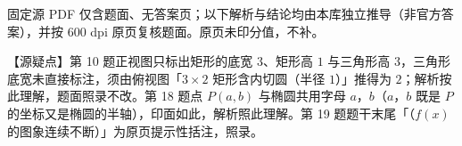 
\begin{gktip}
固定源 PDF 仅含题面、无答案页；以下解析与结论均由本库独立推导（非官方答案），并按 600 dpi 原页复核题面。原页未印分值，不补。

【源疑点】第 10 题正视图只标出矩形的底宽 $3$、矩形高 $1$ 与三角形高 $3$，三角形底宽未直接标注，须由俯视图「$3\times2$ 矩形含内切圆（半径 $1$）」推得为 $2$；解析按此理解，题面照录不改。第 18 题点 $P(a,b)$ 与椭圆共用字母 $a$，$b$（$a$，$b$ 既是 $P$ 的坐标又是椭圆的半轴），印面如此，解析照此理解。第 19 题题干末尾「（$f(x)$ 的图象连续不断）」为原页提示性括注，照录。
\end{gktip}

